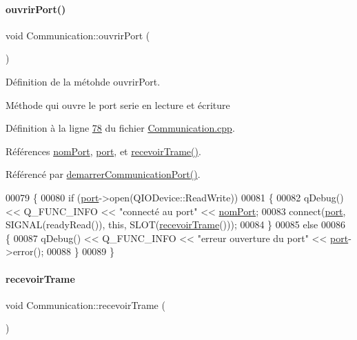 \paragraph{\texorpdfstring{ouvrir\+Port()}{ouvrirPort()}}
{\footnotesize\ttfamily void Communication\+::ouvrir\+Port (\begin{DoxyParamCaption}{ }\end{DoxyParamCaption})}



Définition de la métohde ouvrir\+Port. 

Méthode qui ouvre le port serie en lecture et écriture 

Définition à la ligne \hyperlink{_communication_8cpp_source_l00078}{78} du fichier \hyperlink{_communication_8cpp_source}{Communication.\+cpp}.



Références \hyperlink{_communication_8h_source_l00069}{nom\+Port}, \hyperlink{_communication_8h_source_l00067}{port}, et \hyperlink{_communication_8cpp_source_l00119}{recevoir\+Trame()}.



Référencé par \hyperlink{_communication_8cpp_source_l00042}{demarrer\+Communication\+Port()}.


\begin{DoxyCode}
00079 \{
00080     \textcolor{keywordflow}{if} (\hyperlink{class_communication_aff7d55208f31232fbdc1dcec488908f1}{port}->open(QIODevice::ReadWrite))
00081     \{
00082         qDebug() << Q\_FUNC\_INFO << \textcolor{stringliteral}{"connecté au port"} << \hyperlink{class_communication_a5fa89ee1fc732871f3f8f177fb50bf2a}{nomPort};
00083         connect(\hyperlink{class_communication_aff7d55208f31232fbdc1dcec488908f1}{port}, SIGNAL(readyRead()), \textcolor{keyword}{this}, SLOT(\hyperlink{class_communication_a0b8edc96112e71e1ec4a28cc6309cbbc}{recevoirTrame}()));
00084     \}
00085     \textcolor{keywordflow}{else}
00086     \{
00087         qDebug() << Q\_FUNC\_INFO << \textcolor{stringliteral}{"erreur ouverture du port"} << \hyperlink{class_communication_aff7d55208f31232fbdc1dcec488908f1}{port}->error();
00088     \}
00089 \}
\end{DoxyCode}
\mbox{\label{class_communication_a0b8edc96112e71e1ec4a28cc6309cbbc}} 
\paragraph{\texorpdfstring{recevoir\+Trame}{recevoirTrame}}
{\footnotesize\ttfamily void Communication\+::recevoir\+Trame (\begin{DoxyParamCaption}{ }\end{DoxyParamCaption})\hspace{0.3cm}{\ttfamily [slot]}}



